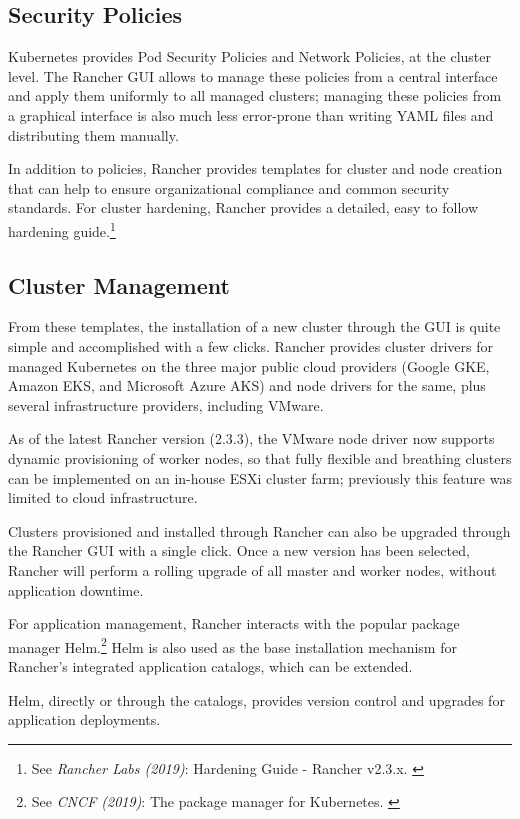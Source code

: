 \subsection{Security Policies}

Kubernetes provides Pod Security Policies and Network Policies, at the cluster level. The Rancher GUI allows to manage these policies from a central interface and apply them uniformly to all managed clusters; managing these policies from a graphical interface is also much less error-prone than writing YAML files and distributing them manually.

In addition to policies, Rancher provides templates for cluster and node creation that can help to ensure organizational compliance and common security standards. For cluster hardening, Rancher provides a detailed, easy to follow hardening guide.\footnote{See \textit{Rancher Labs (2019)}: Hardening Guide - Rancher v2.3.x. \cite{hardeningGuide}}

\subsection{Cluster Management}

From these templates, the installation of a new cluster through the GUI is quite simple and accomplished with a few clicks. Rancher provides cluster drivers for managed Kubernetes on the three major public cloud providers (Google GKE, Amazon EKS, and Microsoft Azure AKS) and node drivers for the same, plus several infrastructure providers, including VMware.

As of the latest Rancher version (2.3.3), the VMware node driver now supports dynamic provisioning of worker nodes, so that fully flexible and breathing clusters can be implemented on an in-house ESXi cluster farm; previously this feature was limited to cloud infrastructure.

Clusters provisioned and installed through Rancher can also be upgraded through the Rancher GUI with a single click. Once a new version has been selected, Rancher will perform a rolling upgrade of all master and worker nodes, without application downtime.

For application management, Rancher interacts with the popular package manager Helm.\footnote{See \textit{CNCF (2019)}: The package manager for Kubernetes. \cite{helm}} Helm is also used as the base installation mechanism for Rancher's integrated application catalogs, which can be extended.

Helm, directly or through the catalogs, provides version control and upgrades for application deployments.

